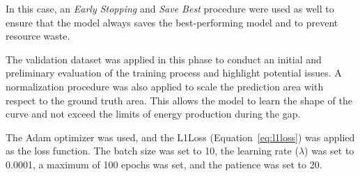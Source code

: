 In this case, an \textit{Early Stopping} and \textit{Save Best} procedure were used %
as well to ensure that the model always saves the best-performing model and to prevent
resource waste.

The validation dataset was applied in this phase to conduct an initial
and preliminary evaluation of the training process and highlight potential issues.
A normalization procedure was also applied to scale the prediction area with respect
to the ground truth area.
This allows the model to learn the shape of the curve and not exceed the limits
of energy production during the gap.

The Adam optimizer was used, and the L1Loss (Equation~\ref{eq:l1loss}) was applied as the loss function.
The batch size was set to 10, the learning rate ($\lambda$) was set to 0.0001,
a maximum of 100 epochs was set, and the patience was set to 20.




